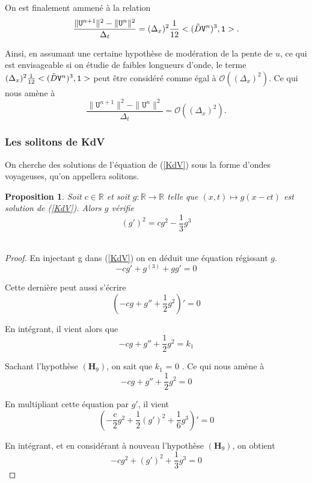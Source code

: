 \documentclass[12pt,a4paper]{article}
\newtheorem{prop}[dfn]{\textbf{Proposition}}
\numberwithin{equation}{section}
\begin{document}
On est finalement ammené à la relation 
\begin{equation*}
    \frac{\|\texttt{U}^{n+1}\|^2-\|\texttt{U}^{n}\|^2}{\Delta_t} = (\Delta_x)^2\frac{1}{12}<(\Tilde{D}\texttt{V}^n)^3 ,\texttt{1}> .
\end{equation*}

Ainsi, en assumant une certaine hypothèse de modération de la pente de $u$, ce qui est envisageable si on étudie de faibles longueurs d'onde, le terme  $(\Delta_x)^2\frac{1}{12}<(\Tilde{D}\texttt{V}^n)^3 ,\texttt{1}> $ peut être considéré comme égal à $\mathcal{O}((\Delta_x)^2)$. Ce qui nous amène à 
\begin{equation*}
    \frac{\|\texttt{U}^{n+1}\|^2-\|\texttt{U}^{n}\|^2}{\Delta_t} = \mathcal{O}((\Delta_x)^2).
\end{equation*}

\subsubsection{Les solitons de KdV}
On cherche des solutions de l'équation de (\ref{KdV}) sous la forme d'ondes voyageuses, qu'on appellera solitons. 
\begin{prop}
    Soit $c \in \mathbb{R}$ et soit $g:\mathbb{R}\rightarrow\mathbb{R}$ telle que $ (x,t)\mapsto g(x - ct)$ est solution de (\ref{KdV}). Alors $g$ vérifie
    \begin{equation}
     (g')^2  = cg^2 - \frac{1}{3}g^3 \label{eq_soliton}
    \end{equation}\\
\end{prop}
\begin{proof}
    En injectant g dans (\ref{KdV}) on en déduit une équation régissant $g$.
\begin{equation*}
    -cg' + g^{(3)} + gg' = 0 
\end{equation*}

Cette dernière peut aussi s'écrire
\begin{equation*}
    \left(-cg + g'' + \frac{1}{2}g^2\right)' = 0 
\end{equation*}

En intégrant, il vient alors que
\begin{equation*}
        -cg + g'' + \frac{1}{2}g^2 = k_1
\end{equation*}

Sachant l'hypothèse $(\textbf{H}_9)$, on sait que $k_1$ = 0 . Ce qui nous amène à 
\begin{equation*}
        -cg + g'' + \frac{1}{2}g^2 = 0
\end{equation*}

En multipliant cette équation par $g'$, il vient 
\begin{equation*}
        \left(-\frac{c}{2}g^2 + \frac{1}{2}(g')^2 + \frac{1}{6}g^3\right)' = 0
\end{equation*}

En intégrant, et en considérant à nouveau l'hypothèse $(\textbf{H}_9)$, on obtient
\begin{equation*}
     -cg^2 + (g')^2 + \frac{1}{3}g^3 = 0
\end{equation*}
\end{proof}
\end{document}

